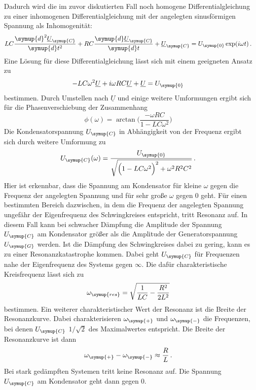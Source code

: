 Dadurch wird die im zuvor diskutierten Fall noch homogene Differentialgleichung zu einer
inhomogenen Differentialgleichung mit der angelegten sinusförmigen Spannung
als Inhomogenität:
\begin{equation}
  LC\frac{\symup{d}^2\underline{U}_{\symup{C}}}{\symup{d}t^2}
  +RC\frac{\symup{d}\underline{U}_{\symup{C}}}{\symup{d}t}
  +\underline{U}_{\symup{C}} = U_{\symup{0}}\exp(i\omega t) \,.
\end{equation}
Eine Lösung für diese Differentialgleichung lässt sich mit einem geeigneten Ansatz
zu
\begin{equation}
  -LC\omega^2\underline{U}+i\omega R C\underline{U}+\underline{U}=U_{\symup{0}}
\end{equation}
bestimmen. Durch Umstellen nach $\underline{U}$ und einige weitere Umformungen ergibt
sich für die Phasenverschiebung der Zusammenhang
\begin{equation}
  \phi(\omega)=\arctan\biggl(\frac{-\omega R C}{1-L C \omega^2}\biggr)
  \label{eqn:phase}
\end{equation}
Die Kondensatorspannung $U_{\symup{C}}$ in Abhängigkeit von der Frequenz ergibt sich
durch weitere Umformung zu
\begin{equation}
  U_{\symup{C}}(\omega)=\frac{U_{\symup{0}}}{\sqrt{\Bigl(1-LC\omega^2\Bigr)^2+\omega^2 R^2 C^2}} \,.
  \label{eqn:Ucfrequenz}
\end{equation}
Hier ist erkennbar, dass die Spannung am Kondensator für kleine $\omega$ gegen
die Frequenz der angelegten Spannung und für sehr große $\omega$ gegen $0$ geht.
Für einen bestimmten Bereich dazwischen, in dem die Frequenz der angelegten Spannung
ungefähr der Eigenfrequenz des Schwingkreises entspricht, tritt Resonanz auf. In
diesem Fall kann bei schwacher Dämpfung die Amplitude der Spannung $U_{\symup{C}}$ am Kondensator größer
als die Amplitude der Generatorspannung $U_{\symup{G}}$ werden. Ist die Dämpfung
des Schwingkreises dabei zu gering, kann es zu einer Resonanzkatastrophe kommen.
Dabei geht $U_{\symup{C}}$ für Frequenzen nahe der Eigenfrequenz des Systems
gegen $\infty$. Die dafür charakteristische Kreisfrequenz lässt sich zu
\begin{equation}
  \omega_{\symup{res}}=\sqrt{\frac{1}{LC}-\frac{R^2}{2L^2}}
\end{equation}
bestimmen. Ein weiterer charakteristischer Wert der Resonanz ist die Breite
der Resonanzkurve. Dabei charakterisieren $\omega_{\symup{+}}$ und $\omega_{\symup{-}}$
die Frequenzen, bei denen $U_{\symup{C}}$ $1/\sqrt{2}$ des Maximalwertes entspricht.
Die Breite der Resonanzkurve ist dann
\begin{equation}
  \omega_{\symup{+}} - \omega_{\symup{-}} \approx \frac{R}{L} \,.
\end{equation}
Bei stark gedämpften Systemen tritt keine Resonanz auf. Die Spannung $U_{\symup{C}}$
am Kondensator geht dann gegen $0$.

